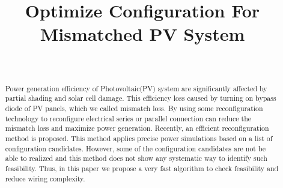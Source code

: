\documentclass[conference]{IEEEtran}
\begin{document}
\title{Optimize Configuration For Mismatched PV System}
\author{
\\
\and
{}
}

\maketitle

\begin{abstract}
Power generation efficiency of Photovoltaic(PV) system are significantly affected by partial shading and solar cell damage. This efficiency loss caused by turning on bypass diode of PV panels, which we called mismatch loss. By using some reconfiguration technology to reconfigure electrical series or parallel connection can reduce the mismatch loss and maximize power generation. Recently, an efficient reconfiguration method is proposed. This method applies precise power simulations based on a list of configuration candidates. However, some of the configuration candidates are not be able to realized and this method does not show any systematic way to identify such feasibility. Thus, in this paper we propose a very fast algorithm to check feasibility and reduce wiring complexity.
\end{abstract}

\end{document}
